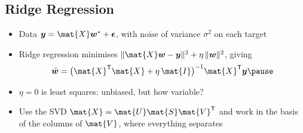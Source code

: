 \begin{slide}
\section[-1]{Ridge Regression}

\begin{PauseHighLight}
  \begin{itemize}
  \item Data $\bm{y} = \mat{X}\bm{w}^* + \bm{\epsilon}$, with noise of
    variance $\sigma^2$ on each target\pause
  \item Ridge regression minimises $\|\mat{X}\bm{w} - \bm{y}\|^2 +
    \eta\,\|\bm{w}\|^2$, giving
    \begin{align*}
      \hat{\bm{w}} = \bigl(\mat{X}^\tr\mat{X} + \eta\,\mat{I}\bigr)^{-1}
      \mat{X}^\tr\bm{y}\pause
    \end{align*}
  \item $\eta = 0$ is least squares: unbiased, but how variable?\pause
  \item Use the SVD $\mat{X} = \mat{U}\mat{S}\mat{V}^\tr$ and work in
    the basis of the columns of $\mat{V}$, where everything
    separates\pause
  \end{itemize}
\end{PauseHighLight}

\end{slide}


